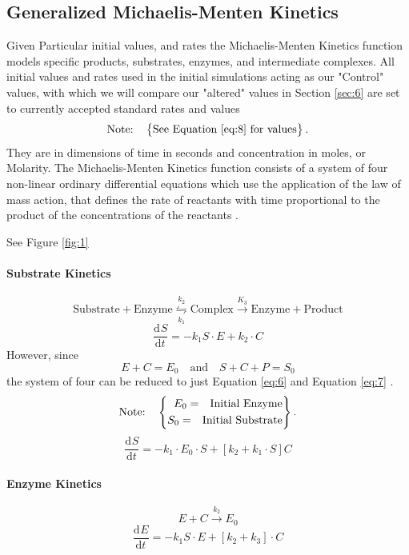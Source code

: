 \documentclass[smallextended]{svjour3}
\newcommand{\od}[3][]{\ensuremath{\frac{\mathrm{d}^{#1} {#2}}{\mathrm{d}{#3}^{#1}}}}
\newcommand{\TwoNote}[4]{$$\text{Note:}\quad\left\{\begin{aligned} {#1} \text{\quad #2} \\
{#3} \text{\quad #4} \\ \end{aligned}\right\}.$$}
\newcommand{\ZeroNote}[1]{$$\text{Note:}\quad\left\{\begin{aligned} {#1} \end{aligned}\right\}.$$}
\begin{document}
\subsection{Generalized Michaelis-Menten Kinetics}

Given Particular initial values, and rates the Michaelis-Menten Kinetics function models specific products, substrates, enzymes, and intermediate complexes. All initial values and rates used in the initial simulations acting as our "Control" values, with which we will compare our "altered" values in Section \ref{sec:6} are set to currently accepted standard rates and values
%
\ZeroNote{\text{See Equation } \ref{eq:8} \text{ for values}}          %
%
They are in dimensions of time in seconds and concentration in moles, or Molarity.
%
The Michaelis-Menten Kinetics function consists of a system of four non-linear ordinary differential equations which use the application of the law of mass action, that defines the rate of reactants with time proportional to the product of the concentrations of the reactants \cite{Ref28}. 

See Figure \ref{fig:1}                                                %
\paragraph{Substrate Kinetics}
$$\text{Substrate} + \text{Enzyme} \underset{k_1}{\stackrel{k_2}{\leftrightharpoons}}\text{Complex} \overset{K_3} \longrightarrow \text{Enzyme} + \text{Product}$$  
%
$$\od{S}{t}= -k_1 S \cdot E +  k_2 \cdot C $$
\quad However, since $$ E + C = E_0 \quad \text{and} \quad S + C + P = S_0 $$
\quad the system of four can be reduced to just Equation \ref{eq:6} and Equation \ref{eq:7} \cite{Ref28}.
%
\TwoNote{E_0=}{Initial Enzyme}{S_0=}{Initial Substrate}                 %
%
\begin{equation}
\label{eq:6}
\od{S}{t}= -k_1 \cdot E_0 \cdot S + {[k_2 + k_1 \cdot S]}C
\end{equation}
\paragraph{Enzyme Kinetics}
%
$$E + C \overset{k_2} \longrightarrow E_0$$ 
%
$$ \od{E}{t}= -k_1 S \cdot E +  {[k_2 + k_3]} \cdot C $$
\end{document}
